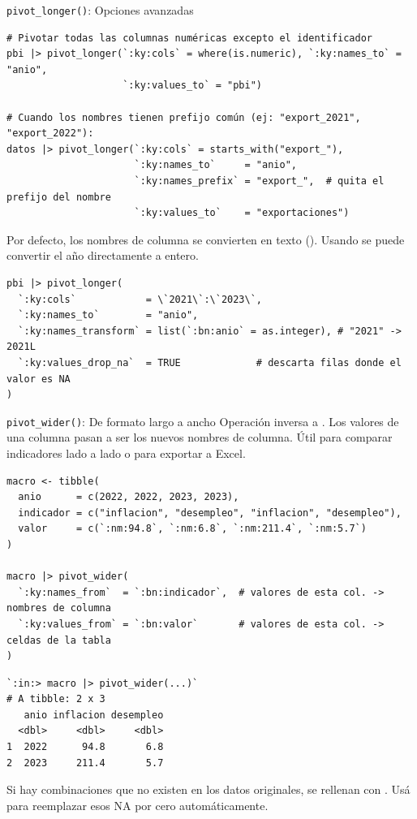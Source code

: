 \documentclass[8pt]{beamer}
\begin{document}
	\begin{frame}[fragile]{\texttt{pivot\_longer()}: Opciones avanzadas}
\begin{lstlisting}[style=RScript]
# Pivotar todas las columnas numéricas excepto el identificador
pbi |> pivot_longer(`:ky:cols` = where(is.numeric), `:ky:names_to` = "anio",
                    `:ky:values_to` = "pbi")

# Cuando los nombres tienen prefijo común (ej: "export_2021", "export_2022"):
datos |> pivot_longer(`:ky:cols` = starts_with("export_"),
                      `:ky:names_to`     = "anio",
                      `:ky:names_prefix` = "export_",  # quita el prefijo del nombre
                      `:ky:values_to`    = "exportaciones")
\end{lstlisting}

		Por defecto, los nombres de columna se convierten en texto (). Usando  se puede convertir el año directamente a entero.
\begin{lstlisting}[style=RScript]
pbi |> pivot_longer(
  `:ky:cols`            = \`2021\`:\`2023\`,
  `:ky:names_to`        = "anio",
  `:ky:names_transform` = list(`:bn:anio` = as.integer), # "2021" -> 2021L
  `:ky:values_drop_na`  = TRUE             # descarta filas donde el valor es NA
)
\end{lstlisting}
	\end{frame}


	\begin{frame}[fragile]{\texttt{pivot\_wider()}: De formato largo a ancho}
		Operación inversa a . Los valores de una columna pasan a ser los nuevos nombres de columna. Útil para comparar indicadores lado a lado o para exportar a Excel.

\begin{lstlisting}[style=RScript]
macro <- tibble(
  anio      = c(2022, 2022, 2023, 2023),
  indicador = c("inflacion", "desempleo", "inflacion", "desempleo"),
  valor     = c(`:nm:94.8`, `:nm:6.8`, `:nm:211.4`, `:nm:5.7`)
)

macro |> pivot_wider(
  `:ky:names_from`  = `:bn:indicador`,  # valores de esta col. -> nombres de columna
  `:ky:values_from` = `:bn:valor`       # valores de esta col. -> celdas de la tabla
)
\end{lstlisting}
\begin{lstlisting}[style=RConsole]
`:in:> macro |> pivot_wider(...)`
# A tibble: 2 x 3
   anio inflacion desempleo
  <dbl>     <dbl>     <dbl>
1  2022      94.8       6.8
2  2023     211.4       5.7
\end{lstlisting}

		\begin{block}{}
			Si hay combinaciones que no existen en los datos originales, se rellenan con . Usá  para reemplazar esos NA por cero automáticamente.
		\end{block}
	\end{frame}
\end{document}
